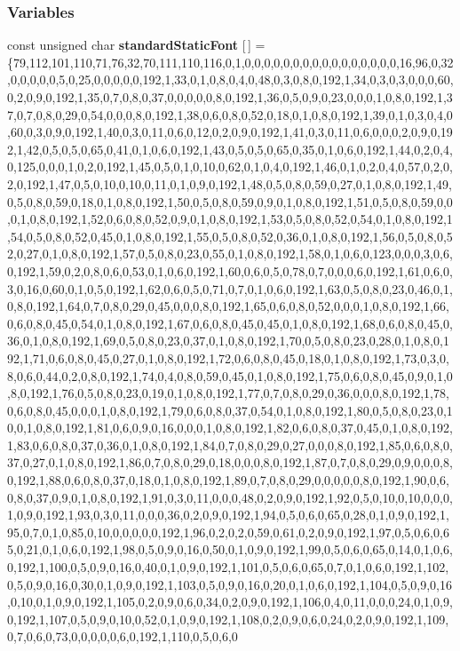 \subsubsection*{Variables}
\begin{DoxyCompactItemize}
\item 
const unsigned char {\bf standard\+Static\+Font} [$\,$] = \{79,112,101,110,71,76,32,70,111,110,116,0,1,0,0,0,0,0,0,0,0,0,0,0,0,0,0,0,0,16,96,0,32,0,0,0,0,0,5,0,25,0,0,0,0,0,192,1,33,0,1,0,8,0,4,0,48,0,3,0,8,0,192,1,34,0,3,0,3,0,0,0,60,0,2,0,9,0,192,1,35,0,7,0,8,0,37,0,0,0,0,0,8,0,192,1,36,0,5,0,9,0,23,0,0,0,1,0,8,0,192,1,37,0,7,0,8,0,29,0,54,0,0,0,8,0,192,1,38,0,6,0,8,0,52,0,18,0,1,0,8,0,192,1,39,0,1,0,3,0,4,0,60,0,3,0,9,0,192,1,40,0,3,0,11,0,6,0,12,0,2,0,9,0,192,1,41,0,3,0,11,0,6,0,0,0,2,0,9,0,192,1,42,0,5,0,5,0,65,0,41,0,1,0,6,0,192,1,43,0,5,0,5,0,65,0,35,0,1,0,6,0,192,1,44,0,2,0,4,0,125,0,0,0,1,0,2,0,192,1,45,0,5,0,1,0,10,0,62,0,1,0,4,0,192,1,46,0,1,0,2,0,4,0,57,0,2,0,2,0,192,1,47,0,5,0,10,0,10,0,11,0,1,0,9,0,192,1,48,0,5,0,8,0,59,0,27,0,1,0,8,0,192,1,49,0,5,0,8,0,59,0,18,0,1,0,8,0,192,1,50,0,5,0,8,0,59,0,9,0,1,0,8,0,192,1,51,0,5,0,8,0,59,0,0,0,1,0,8,0,192,1,52,0,6,0,8,0,52,0,9,0,1,0,8,0,192,1,53,0,5,0,8,0,52,0,54,0,1,0,8,0,192,1,54,0,5,0,8,0,52,0,45,0,1,0,8,0,192,1,55,0,5,0,8,0,52,0,36,0,1,0,8,0,192,1,56,0,5,0,8,0,52,0,27,0,1,0,8,0,192,1,57,0,5,0,8,0,23,0,55,0,1,0,8,0,192,1,58,0,1,0,6,0,123,0,0,0,3,0,6,0,192,1,59,0,2,0,8,0,6,0,53,0,1,0,6,0,192,1,60,0,6,0,5,0,78,0,7,0,0,0,6,0,192,1,61,0,6,0,3,0,16,0,60,0,1,0,5,0,192,1,62,0,6,0,5,0,71,0,7,0,1,0,6,0,192,1,63,0,5,0,8,0,23,0,46,0,1,0,8,0,192,1,64,0,7,0,8,0,29,0,45,0,0,0,8,0,192,1,65,0,6,0,8,0,52,0,0,0,1,0,8,0,192,1,66,0,6,0,8,0,45,0,54,0,1,0,8,0,192,1,67,0,6,0,8,0,45,0,45,0,1,0,8,0,192,1,68,0,6,0,8,0,45,0,36,0,1,0,8,0,192,1,69,0,5,0,8,0,23,0,37,0,1,0,8,0,192,1,70,0,5,0,8,0,23,0,28,0,1,0,8,0,192,1,71,0,6,0,8,0,45,0,27,0,1,0,8,0,192,1,72,0,6,0,8,0,45,0,18,0,1,0,8,0,192,1,73,0,3,0,8,0,6,0,44,0,2,0,8,0,192,1,74,0,4,0,8,0,59,0,45,0,1,0,8,0,192,1,75,0,6,0,8,0,45,0,9,0,1,0,8,0,192,1,76,0,5,0,8,0,23,0,19,0,1,0,8,0,192,1,77,0,7,0,8,0,29,0,36,0,0,0,8,0,192,1,78,0,6,0,8,0,45,0,0,0,1,0,8,0,192,1,79,0,6,0,8,0,37,0,54,0,1,0,8,0,192,1,80,0,5,0,8,0,23,0,10,0,1,0,8,0,192,1,81,0,6,0,9,0,16,0,0,0,1,0,8,0,192,1,82,0,6,0,8,0,37,0,45,0,1,0,8,0,192,1,83,0,6,0,8,0,37,0,36,0,1,0,8,0,192,1,84,0,7,0,8,0,29,0,27,0,0,0,8,0,192,1,85,0,6,0,8,0,37,0,27,0,1,0,8,0,192,1,86,0,7,0,8,0,29,0,18,0,0,0,8,0,192,1,87,0,7,0,8,0,29,0,9,0,0,0,8,0,192,1,88,0,6,0,8,0,37,0,18,0,1,0,8,0,192,1,89,0,7,0,8,0,29,0,0,0,0,0,8,0,192,1,90,0,6,0,8,0,37,0,9,0,1,0,8,0,192,1,91,0,3,0,11,0,0,0,48,0,2,0,9,0,192,1,92,0,5,0,10,0,10,0,0,0,1,0,9,0,192,1,93,0,3,0,11,0,0,0,36,0,2,0,9,0,192,1,94,0,5,0,6,0,65,0,28,0,1,0,9,0,192,1,95,0,7,0,1,0,85,0,10,0,0,0,0,0,192,1,96,0,2,0,2,0,59,0,61,0,2,0,9,0,192,1,97,0,5,0,6,0,65,0,21,0,1,0,6,0,192,1,98,0,5,0,9,0,16,0,50,0,1,0,9,0,192,1,99,0,5,0,6,0,65,0,14,0,1,0,6,0,192,1,100,0,5,0,9,0,16,0,40,0,1,0,9,0,192,1,101,0,5,0,6,0,65,0,7,0,1,0,6,0,192,1,102,0,5,0,9,0,16,0,30,0,1,0,9,0,192,1,103,0,5,0,9,0,16,0,20,0,1,0,6,0,192,1,104,0,5,0,9,0,16,0,10,0,1,0,9,0,192,1,105,0,2,0,9,0,6,0,34,0,2,0,9,0,192,1,106,0,4,0,11,0,0,0,24,0,1,0,9,0,192,1,107,0,5,0,9,0,10,0,52,0,1,0,9,0,192,1,108,0,2,0,9,0,6,0,24,0,2,0,9,0,192,1,109,0,7,0,6,0,73,0,0,0,0,0,6,0,192,1,110,0,5,0,6,0
\end{DoxyCompactItemize}
